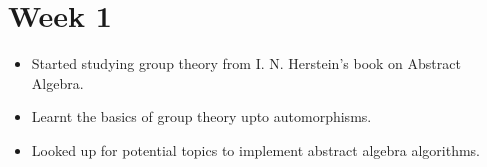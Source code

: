 \section{Week 1}
\begin{itemize}
    \item Started studying group theory from I. N. Herstein's book on Abstract Algebra.
    \item Learnt the basics of group theory upto automorphisms.
    \item Looked up for potential topics to implement abstract algebra algorithms.
\end{itemize}